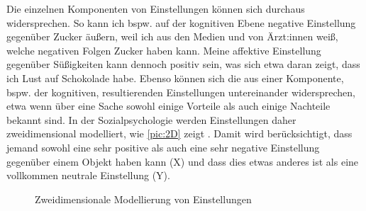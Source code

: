Die einzelnen Komponenten von Einstellungen können sich durchaus widersprechen. 
So kann ich bspw. auf der kognitiven Ebene negative Einstellung gegenüber Zucker äußern, weil ich aus den Medien und von Ärzt:innen weiß, welche negativen Folgen Zucker haben kann. 
Meine affektive Einstellung gegenüber Süßigkeiten kann dennoch positiv sein, was sich etwa daran zeigt, dass ich Lust auf Schokolade habe.
Ebenso können sich die aus einer Komponente, bspw. der kognitiven, resultierenden Einstellungen untereinander widersprechen, etwa wenn über eine Sache sowohl einige Vorteile als auch einige Nachteile bekannt sind. 
In der Sozialpsychologie werden Einstellungen daher zweidimensional modelliert, wie \autoref{pic:2D} zeigt \citep[s.][207]{Jonas.2014}. 
Damit wird berücksichtigt, dass jemand sowohl eine sehr positive als auch eine sehr negative Einstellung gegenüber einem Objekt haben kann (X) und dass dies etwas anderes ist als eine vollkommen neutrale Einstellung (Y). 

\begin{figure}
\caption{Zweidimensionale Modellierung von Einstellungen \citep[s.][207]{Jonas.2014}}
\label{pic:2D}
\end{figure}

